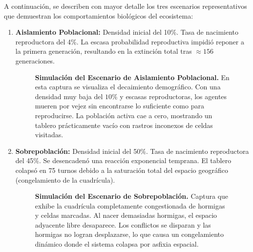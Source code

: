 \documentclass[12pt,a4paper]{article}
\begin{document}
A continuación, se describen con mayor detalle los tres escenarios representativos que demuestran los comportamientos biológicos del ecosistema:
\begin{enumerate}
    \item \textbf{Aislamiento Poblacional:} Densidad inicial del 10\%. Tasa de nacimiento reproductora del 4\%. La escasa probabilidad reproductiva impidió reponer a la primera generación, resultando en la extinción total tras $\approx 156$ generaciones.

    \begin{figure}[H]
        \centering
        \caption{\textbf{Simulación del Escenario de Aislamiento Poblacional.} En esta captura se visualiza el decaimiento demográfico. Con una densidad muy baja del $10\%$ y escasas reproductoras, los agentes mueren por vejez sin encontrarse lo suficiente como para reproducirse. La población activa cae a cero, mostrando un tablero prácticamente vacío con rastros inconexos de celdas visitadas.}
        \label{fig:captura_aislamiento}
    \end{figure}

    \item \textbf{Sobrepoblación:} Densidad inicial del 50\%. Tasa de nacimiento reproductora del 45\%. Se desencadenó una reacción exponencial temprana. El tablero colapsó en 75 turnos debido a la saturación total del espacio geográfico (congelamiento de la cuadrícula).

    \begin{figure}[H]
        \centering
        \caption{\textbf{Simulación del Escenario de Sobrepoblación.} Captura que exhibe la cuadrícula completamente congestionada de hormigas y celdas marcadas. Al nacer demasiadas hormigas, el espacio adyacente libre desaparece. Los conflictos se disparan y las hormigas no logran desplazarse, lo que causa un congelamiento dinámico donde el sistema colapsa por asfixia espacial.}
        \label{fig:captura_sobrepoblacion}
    \end{figure}


\end{enumerate}
\end{document}
